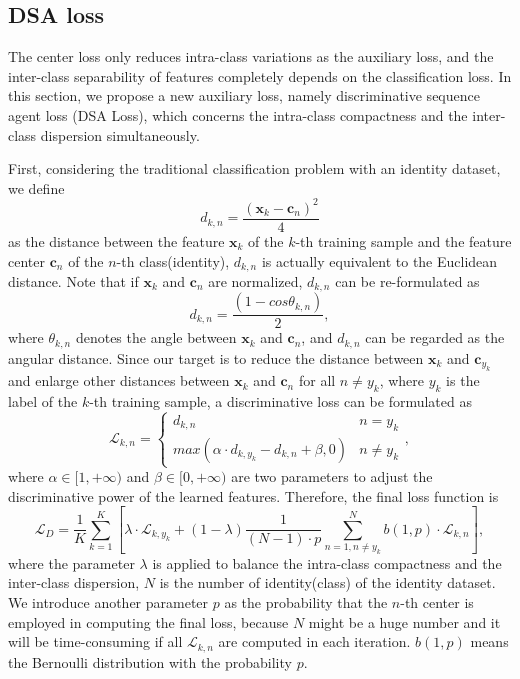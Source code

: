 \documentclass[conference]{acmsiggraph}
\renewcommand{\vec}[1]{\mathbf{#1}}
\begin{document}
\subsection{DSA loss}
\label{secDSA}

The center loss only reduces intra-class variations as the auxiliary loss, and the inter-class separability of features completely depends on the classification loss. In this section, we propose a new auxiliary loss, namely discriminative sequence agent loss (DSA Loss), which concerns the intra-class compactness and the inter-class dispersion simultaneously.

First, considering the traditional classification problem with an identity dataset, we define 
\begin{equation}
d_{k,n}=\frac{(\vec{x}_k - \vec{c}_n)^2}{4}
\label{equDistance}
\end{equation}
 as the distance between the feature $\vec{x}_k$ of the $k$-th training sample and the feature center $\vec{c}_n$ of the $n$-th class(identity), $d_{k,n}$ is actually equivalent to the Euclidean distance. Note that if $\vec{x}_k$ and $\vec{c}_n$ are normalized, $d_{k,n}$ can be re-formulated as
\begin{equation}
d_{k,n} = \frac{(1-cos \theta_{k,n})}{2},
\end{equation} 
where $\theta_{k,n}$ denotes the angle between $\vec{x}_k$ and $\vec{c}_n$, and $d_{k,n}$ can be regarded as the angular distance. Since our target is to reduce the distance between $\vec{x}_k$ and $\vec{c}_{y_k}$ and enlarge other distances between $\vec{x}_k$ and $\vec{c}_{n}$ for all $n \neq y_k$, where $y_k$ is the label of the $k$-th training sample, a discriminative loss can be formulated as 
\begin{equation}
\mathcal{L}_{k,n}=
\begin{cases}
d_{k,n} & n = y_k\\
max(\alpha \cdot d_{k,y_k} - d_{k,n} + \beta, 0) & n \neq y_k
\end{cases},
\end{equation}
where $\alpha \in [1,+\infty)$ and $\beta \in [0,+\infty)$ are two parameters to adjust the discriminative power of the learned features. Therefore, the final loss function is
\begin{equation}
\mathcal{L}_{D}=\frac{1}{K}\sum \limits_{k=1}^{K} \left[ \lambda \cdot \mathcal{L}_{k,y_k} + 
(1 - \lambda )\frac{1}{(N-1) \cdot p} \sum \limits_{n=1, n \neq y_k}^{N}b(1,p) \cdot \mathcal{L}_{k,n} \right],
\label{equDSALoss}
\end{equation}
where the parameter $\lambda$ is applied to balance the intra-class compactness and the inter-class dispersion, $N$ is the number of identity(class) of the identity dataset. We introduce another parameter $p$ as the probability that the $n$-th center is employed in computing the final loss, because $N$ might be a huge number and it will be time-consuming if all $\mathcal{L}_{k,n}$ are computed in each iteration. $b(1,p)$ means the Bernoulli distribution with the probability $p$. 
\end{document}
